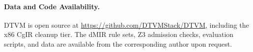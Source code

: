 \paragraph{Data and Code Availability.} DTVM is open source at
\url{https://github.com/DTVMStack/DTVM}, including the x86 CgIR cleanup
tier. The dMIR rule sets, Z3 admission checks, evaluation scripts, and
data are available from the corresponding author upon request.
